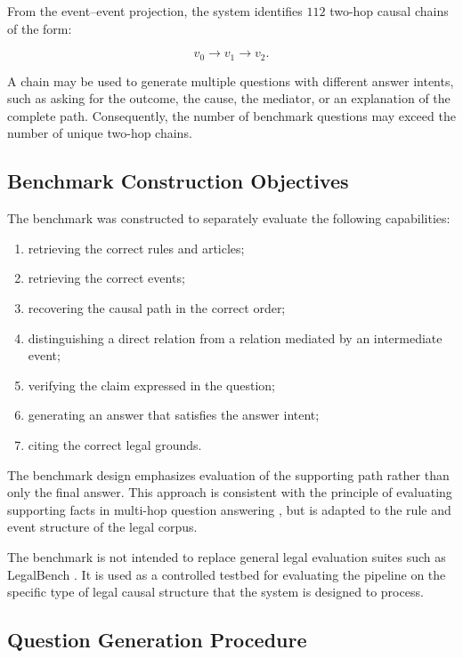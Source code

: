 From the event--event projection, the system identifies \(112\) two-hop
causal chains of the form:

\[
v_0 \rightarrow v_1 \rightarrow v_2.
\]

A chain may be used to generate multiple questions with different answer
intents, such as asking for the outcome, the cause, the mediator, or an
explanation of the complete path. Consequently, the number of benchmark
questions may exceed the number of unique two-hop chains.

\subsection{Benchmark Construction Objectives}

The benchmark was constructed to separately evaluate the following
capabilities:

\begin{enumerate}
    \item retrieving the correct rules and articles;
    \item retrieving the correct events;
    \item recovering the causal path in the correct order;
    \item distinguishing a direct relation from a relation mediated by an
    intermediate event;
    \item verifying the claim expressed in the question;
    \item generating an answer that satisfies the answer intent;
    \item citing the correct legal grounds.
\end{enumerate}

The benchmark design emphasizes evaluation of the supporting path rather than
only the final answer. This approach is consistent with the principle of
evaluating supporting facts in multi-hop question answering
\cite{yang2018hotpotqa}, but is adapted to the rule and event structure of the
legal corpus.

The benchmark is not intended to replace general legal evaluation suites such
as LegalBench \cite{guha2023legalbench}. It is used as a controlled testbed for
evaluating the pipeline on the specific type of legal causal structure that
the system is designed to process.

\subsection{Question Generation Procedure}

